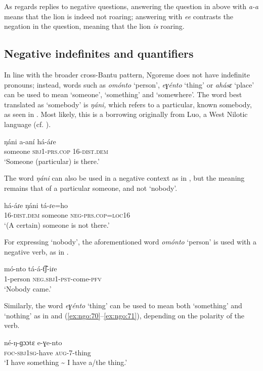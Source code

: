 \documentclass[output=paper,colorlinks,citecolor=brown,draftmode]{langscibook}
\begin{document}
As regards replies to negative questions, answering the question in  above with \textit{a-a} means that the lion is indeed not roaring; answering with \textit{ee} contrasts the negation in the question, meaning that the lion \textit{is} roaring.

\subsection{Negative indefinites and quantifiers}\label{sec:ngo:3.2}

In line with the broader cross-Bantu pattern, Ngoreme does not have indefinite pronouns; instead, words such as \textit{omónto} ‘person’, \textit{eɣénto} ‘thing’ or \textit{ahásɛ} ‘place’ can be used to mean ‘someone’, ‘something’ and ‘somewhere’. The word best translated as ‘somebody’ is \textit{ŋáni,} which refers to a particular, known somebody, as seen in . Most likely, this is a borrowing originally from Luo, a West Nilotic language (cf. \citealt[529]{Tucker1994}).

\ea\label{ex:ngo:66} 
    \gll ŋáni a-aní há-áɾe\\ 
        someone \textsc{sbj1-prs.cop} 16-\textsc{dist.dem}\\
    \glt ‘Someone (particular) is there.’
\z 

The word \textit{ŋáni} can also be used in a negative context as in , but the meaning remains that of a particular someone, and not ‘nobody’.

\ea\label{ex:ngo:67} 
     \gll há-áɾe ŋáni tá{}-ɾe=ho\\ 
        16-\textsc{dist.dem} someone \textsc{neg-}\textsc{prs.cop=loc16}\\
     \glt ‘(A certain) someone is not there.’
\z 

For expressing ‘nobody’, the aforementioned word \textit{omónto} ‘person’ is used with a negative verb, as in . 

\ea\label{ex:ngo:68} 
     \gll mó{}-nto tá{}-á{}-t͡ʃ{}-iɾe\\ 
        1-person \textsc{neg.sbj1-pst}{}-come-\textsc{pfv}\\
    \glt ‘Nobody came.’
\z 

Similarly, the word \textit{eɣénto} ‘thing’ can be used to mean both ‘something’ and ‘nothing’ as in  and (\ref{ex:ngo:70}--\ref{ex:ngo:71}), depending on the polarity of the verb. 

\ea\label{ex:ngo:69} 
    \gll né{}-ŋ{}-ɡɔɔtɛ e{}-ɣe{}-nto\\ 
        \textsc{foc-sbj1sg}{}-have \textsc{aug}{}-7-thing\\
    \glt ‘I have something {\textasciitilde} I have a/the thing.’
\z 
\end{document}
